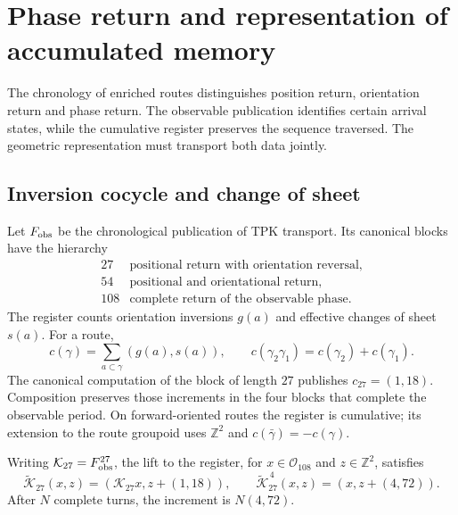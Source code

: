 \chapter{Phase return and representation of accumulated memory}
\label{x_reciprocidad:vii:sec:retorno-memoria-gravedad}

The chronology of enriched routes distinguishes position return,
orientation return and phase return. The observable publication
identifies certain arrival states, while the cumulative register
preserves the sequence traversed. The geometric representation must
transport both data jointly.

\section{Inversion cocycle and change of sheet}
\label{x_reciprocidad:vii:subsec:cociclo-memoria}

Let \(F_{\rm obs}\) be the chronological publication of TPK transport.
Its canonical blocks have the hierarchy
\[
\begin{array}{c|l}
27&\text{positional return with orientation reversal},\\
54&\text{positional and orientational return},\\
108&\text{complete return of the observable phase}.
\end{array}
\]
The register counts orientation inversions \(g(a)\) and
effective changes of sheet \(s(a)\). For a route,
\begin{equation}
 c(\gamma)=\sum_{a\subset\gamma}(g(a),s(a)),\qquad
 c(\gamma_2\gamma_1)=c(\gamma_2)+c(\gamma_1).
 \label{x_reciprocidad:vii:eq:cociclo-ruta}
\end{equation}
The canonical computation of the block of length \(27\) publishes
\(c_{27}=(1,18)\). Composition preserves those increments in
the four blocks that complete the observable period.
On forward-oriented routes the register is cumulative;
its extension to the route groupoid uses \(\mathbb Z^2\) and
\(c(\bar\gamma)=-c(\gamma)\).

\begin{proposition}
\label{x_reciprocidad:vii:prop:memoria-vuelta-completa}
Writing \(\mathcal K_{27}=F_{\rm obs}^{27}\), the lift
to the register, for \(x\in\mathcal O_{108}\) and \(z\in\mathbb Z^2\), satisfies
\[
 \widetilde{\mathcal K}_{27}(x,z)
   =(\mathcal K_{27}x,z+(1,18)),\qquad
 \widetilde{\mathcal K}_{27}^{\,4}(x,z)
   =(x,z+(4,72)).
\]
After \(N\) complete turns, the increment is \(N(4,72)\).
\end{proposition}

